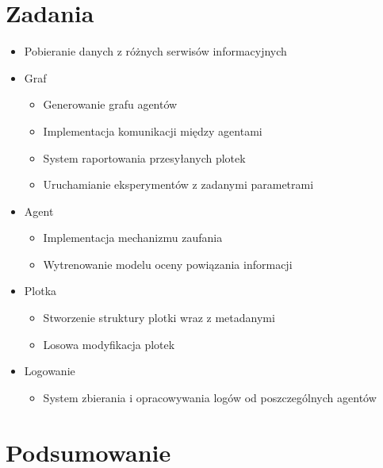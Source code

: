 \documentclass{article}
\begin{document}
	\section{Zadania}
	\begin{itemize}
	\item Pobieranie danych z różnych serwisów informacyjnych
	\item Graf
		\begin{itemize}
		\item Generowanie grafu agentów
		\item Implementacja komunikacji między agentami
		\item System raportowania przesyłanych plotek
		\item Uruchamianie eksperymentów z zadanymi parametrami
		\end{itemize}
	\item Agent
		\begin{itemize}
		\item Implementacja mechanizmu zaufania
		\item Wytrenowanie modelu oceny powiązania informacji
		\end{itemize}
	\item Plotka
		\begin{itemize}
		\item Stworzenie struktury plotki wraz z metadanymi
		\item Losowa modyfikacja plotek
		\end{itemize}
	\item Logowanie
		\begin{itemize}
		\item System zbierania i opracowywania logów od poszczególnych agentów
		\end{itemize}
	\end{itemize}
	
	\section{Podsumowanie}
\end{document}

